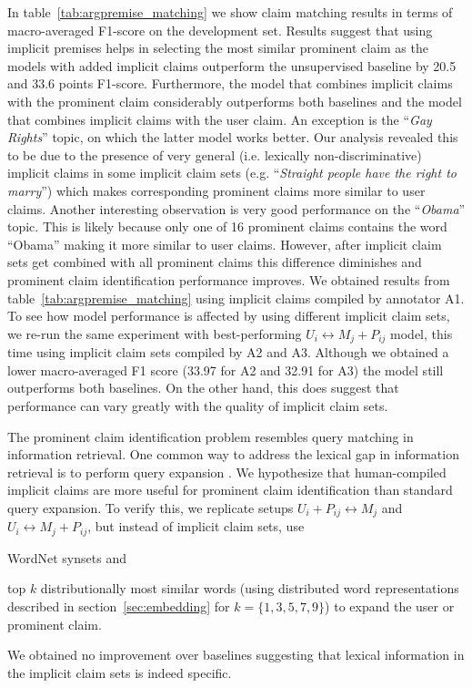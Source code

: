 In table~\ref{tab:argpremise_matching} we show claim matching results in terms of
macro-averaged F1-score on the development set. 
Results suggest that using implicit premises helps in selecting the most similar prominent claim 
as the models with added implicit claims outperform the unsupervised baseline by
20.5 and 33.6 points F1-score. 
Furthermore, the model that combines implicit claims with the prominent claim considerably 
outperforms both baselines and the model that combines implicit claims with the user claim. 
An exception is the ``\emph{Gay Rights}'' topic, on which the latter model works better. 
Our analysis revealed this to be due to the presence of very general 
(i.e. lexically non-discriminative) implicit claims in some implicit claim sets 
(e.g. ``\emph{Straight people
have the right to marry}'') which makes corresponding prominent claims more similar to
user claims. 
Another interesting observation is very good performance on the ``\emph{Obama}'' topic. 
This is likely because only one of 16 prominent claims contains the word ``Obama''
making it more similar to user claims. 
However, after implicit claim sets get combined with all prominent claims this
difference diminishes and prominent claim identification performance improves. 
We obtained results from table~\ref{tab:argpremise_matching} using implicit claims compiled by
annotator A1. 
To see how model performance is affected by using different implicit claim
sets, we re-run the same experiment with best-performing $U_i \leftrightarrow
M_j + P_{ij}$ model, this time using implicit claim sets compiled by A2 and A3. 
Although we obtained a lower macro-averaged F1 score (33.97 for A2 and 32.91 for A3) the model 
still outperforms both baselines. 
On the other hand, this does suggest that performance can vary greatly with the quality of 
implicit claim sets. 


The prominent claim identification problem resembles query matching in
information retrieval. 
One common way to address the lexical gap in information retrieval is to perform
query expansion \citep{voorhees1994query}. 
We hypothesize that human-compiled implicit claims are more useful for prominent claim
identification than standard
query expansion. 
To verify this, we replicate setups $U_i + P_{ij} \leftrightarrow M_j$ and
$U_i \leftrightarrow M_j + P_{ij}$, but instead of implicit claim sets, use
\begin{enumerate*}[label=(\arabic*)]
\item WordNet \citep{miller1995wordnet} synsets and
\item top $k$ distributionally most similar words (using distributed
word representations described in section~\ref{sec:embedding} for $k=\{1, 3, 5, 7, 9\}$) to
expand the user or prominent claim.
\end{enumerate*}
We obtained no improvement over baselines suggesting that lexical information 
in the implicit claim sets is indeed specific. 


